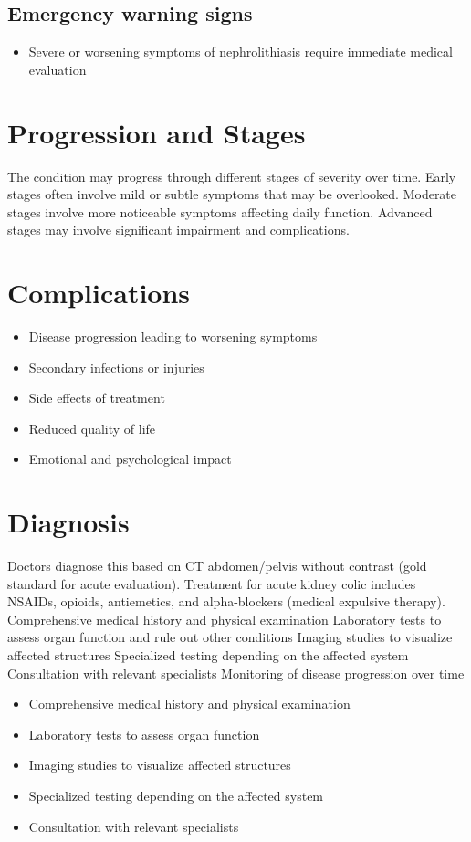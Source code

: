 \subsection{Emergency warning signs}
\begin{itemize}[noitemsep]
  \item Severe or worsening symptoms of nephrolithiasis require immediate medical evaluation
\end{itemize}
\section{Progression and Stages}
The condition may progress through different stages of severity over time. Early stages often involve mild or subtle symptoms that may be overlooked. Moderate stages involve more noticeable symptoms affecting daily function. Advanced stages may involve significant impairment and complications.
\section{Complications}
\begin{itemize}[noitemsep]
  \item Disease progression leading to worsening symptoms
  \item Secondary infections or injuries
  \item Side effects of treatment
  \item Reduced quality of life
  \item Emotional and psychological impact
\end{itemize}
\section{Diagnosis}
Doctors diagnose this based on CT abdomen/pelvis without contrast (gold standard for acute evaluation). Treatment for acute kidney colic includes NSAIDs, opioids, antiemetics, and alpha-blockers (medical expulsive therapy). Comprehensive medical history and physical examination Laboratory tests to assess organ function and rule out other conditions Imaging studies to visualize affected structures Specialized testing depending on the affected system Consultation with relevant specialists Monitoring of disease progression over time

\begin{itemize}[noitemsep]
  \item Comprehensive medical history and physical examination
  \item Laboratory tests to assess organ function
  \item Imaging studies to visualize affected structures
  \item Specialized testing depending on the affected system
  \item Consultation with relevant specialists
\end{itemize}

